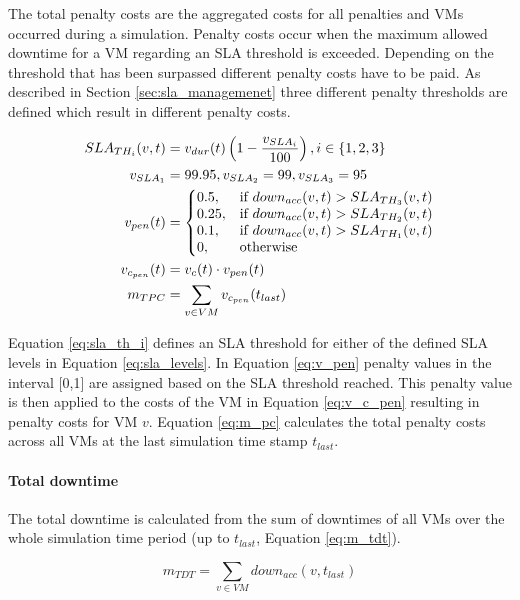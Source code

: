 The total penalty costs are the aggregated costs for all penalties and VMs occurred during a simulation. Penalty costs occur when the maximum allowed downtime for a VM regarding an SLA threshold is exceeded. Depending on the threshold that has been surpassed different penalty costs have to be paid. 
As described in Section \ref{sec:sla_managemenet} three different penalty thresholds are defined which result in different penalty costs. 

\begin{align}
	SLA_{TH_i}(v,t) &= v_{dur}(t) \left( 1 - \frac{v_{SLA_i}}{100} \right), i \in \{1,2,3\} \label{eq:sla_th_i} \\
	v_{SLA_1} &= 99.95, v_{SLA_2} = 99, v_{SLA_3} = 95 \label{eq:sla_levels} \\
	v_{pen}(t) &= \left\{
								\begin{array}{@{}ll@{}}
									0.5, & \text{if } down_{acc}(v,t) > SLA_{TH_3}(v,t) \\
									0.25, & \text{if } down_{acc}(v,t) > SLA_{TH_2}(v,t) \\
									0.1, & \text{if } down_{acc}(v,t) > SLA_{TH_1}(v,t) \\
									0, & \text{otherwise}
								\end{array}\right. \label{eq:v_pen}  \\
	v_{c_{pen}}(t) &= v_c(t) \cdot v_{pen}(t) \label{eq:v_c_pen} \\
	m_{TPC} &= \sum_{v \in VM} v_{c_{pen}}(t_{last}) \label{eq:m_pc} 
\end{align}

Equation \ref{eq:sla_th_i} defines an SLA threshold for either of the defined SLA levels in Equation \ref{eq:sla_levels}. In Equation \ref{eq:v_pen} penalty values in the interval [0,1] are assigned based on the SLA threshold reached. This penalty value is then applied to the costs of the VM in Equation \ref{eq:v_c_pen} resulting in penalty costs for VM $v$. Equation \ref{eq:m_pc} calculates the total penalty costs across all VMs at the last simulation time stamp $t_{last}$. 


\paragraph{Total downtime}

The total downtime is calculated from the sum of downtimes of all VMs over the whole simulation time period (up to $t_{last}$, Equation \ref{eq:m_tdt}). 

\begin{equation}
	m_{TDT} = \sum_{v \in VM} down_{acc}(v,t_{last})
\label{eq:m_tdt}
\end{equation}

